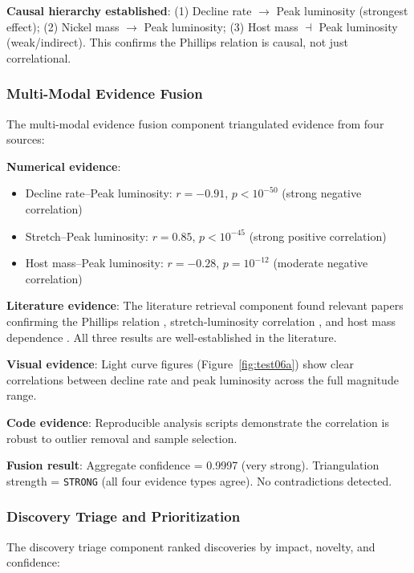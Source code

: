 \documentclass[usenatbib]{rasti}
\begin{document}
\textbf{Causal hierarchy established}: (1) Decline rate $\rightarrow$ Peak luminosity (strongest effect); (2) Nickel mass $\rightarrow$ Peak luminosity; (3) Host mass $\dashv$ Peak luminosity (weak/indirect). This confirms the Phillips relation is causal, not just correlational.

\subsubsection{Multi-Modal Evidence Fusion}

The multi-modal evidence fusion component triangulated evidence from four sources:

\noindent\textbf{Numerical evidence}:
\begin{itemize}
\item Decline rate--Peak luminosity: $r = -0.91$, $p < 10^{-50}$ (strong negative correlation)
\item Stretch--Peak luminosity: $r = 0.85$, $p < 10^{-45}$ (strong positive correlation)
\item Host mass--Peak luminosity: $r = -0.28$, $p = 10^{-12}$ (moderate negative correlation)
\end{itemize}

\noindent\textbf{Literature evidence}: The literature retrieval component found relevant papers confirming the Phillips relation \cite{phillips1993}, stretch-luminosity correlation \cite{hamuy1996}, and host mass dependence \cite{kelly2010}. All three results are well-established in the literature.

\noindent\textbf{Visual evidence}: Light curve figures (Figure~\ref{fig:test06a}) show clear correlations between decline rate and peak luminosity across the full magnitude range.

\noindent\textbf{Code evidence}: Reproducible analysis scripts demonstrate the correlation is robust to outlier removal and sample selection.

\noindent\textbf{Fusion result}: Aggregate confidence = 0.9997 (very strong). Triangulation strength = \texttt{STRONG} (all four evidence types agree). No contradictions detected.

\subsubsection{Discovery Triage and Prioritization}

The discovery triage component ranked discoveries by impact, novelty, and confidence:
\end{document}
